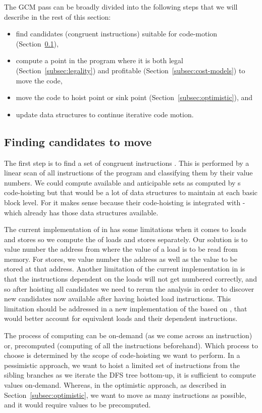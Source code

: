 \documentclass[acmlarge,review,anonymous]{acmart}\settopmatter{printfolios=true}
\begin{document}
The GCM pass can be broadly divided into the following steps that we will
describe in the rest of this section:
\begin{itemize}
\item find candidates (congruent instructions) suitable for code-motion (Section~\ref{subsec:finding-candidates}),
\item compute a point in the program where it is both legal
  (Section~\ref{subsec:legality}) and profitable
  (Section~\ref{subsec:cost-models}) to move the code,
\item move the code to hoist point or sink point
  (Section~\ref{subsec:optimistic}), and
\item update data structures to continue iterative code motion.
\end{itemize}

\subsection{Finding candidates to move}
\label{subsec:finding-candidates}
The first step is to find a set of congruent instructions
\cite{briggs1997}. This is performed by a linear scan of all instructions of the
program and classifying them by their value numbers. We could compute available
and anticipable sets as computed by s code-hoisting but that would be a lot
of data structures to maintain at each basic block level. For \GCC{} it makes sense
because their code-hoisting is integrated with \GVN{}-\PRE{} which already has those
data structures available.

The current implementation of \GVN{} in \LLVM{} has some limitations when it
comes to loads and stores so we compute the \GVN{} of loads and stores
separately.  Our solution is to value number the address from where the value of
a load is to be read from memory. For stores, we value number the address as
well as the value to be stored at that address. Another limitation of the
current \GVN{} implementation in \LLVM{} is that the instructions dependent on
the loads will not get numbered correctly, and so after hoisting all candidates
we need to rerun the \GVN{} analysis in order to discover new candidates now
available after having hoisted load instructions.  This limitation should be
addressed in a new implementation of the \GVN{} based on \MemorySSA{}, that
would better account for equivalent loads and their dependent instructions.

The process of computing \GVN{} can be on-demand (as we come across an
instruction) or, precomputed (computing \GVN{} of all the instructions
beforehand). Which process to choose is determined by the scope of code-hoisting
we want to perform. In a pessimistic approach, we want to hoist a limited set of
instructions from the sibling branches as we iterate the DFS tree bottom-up, it
is sufficient to compute \GVN{} values on-demand. Whereas, in the optimistic
approach, as described in Section~\ref{subsec:optimistic}, we want to move as
many instructions as possible, and it would require \GVN{} values to be
precomputed.
\end{document}

